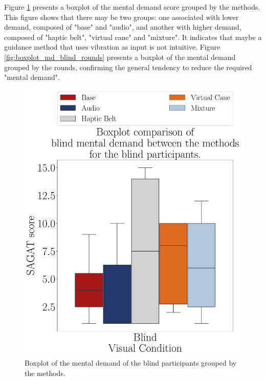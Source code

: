 Figure \ref{fig:boxplot_md_blind_scene}  presents a boxplot of the mental demand score grouped by the methods. This figure shows that there may be two groups: one associated with lower demand, composed of "base" and "audio", and another with higher demand, composed of "haptic belt", "virtual cane" and "mixture". It indicates that maybe a guidance method that uses vibration as input is not intuitive. Figure \ref{fig:boxplot_md_blind_rounds} presents a boxplot of the mental demand grouped by the rounds, confirming the general tendency to reduce the required "mental demand". 

\begin{figure}[!htb]
    \centering
    \begin{minipage}{0.45\textwidth}
        \centering
        \includegraphics[width = \textwidth]{Resultados/Nasa/Figuras/pdf/boxplot_md_blind_scene.pdf}
        \caption{Boxplot of the mental demand of the blind participants grouped by the methods.}
        \label{fig:boxplot_md_blind_scene}
    \end{minipage}
    \begin{minipage}{0.075\textwidth}

\end{minipage}
\end{figure}
